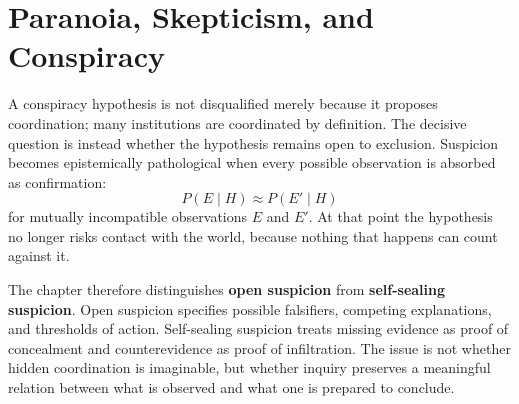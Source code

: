 
\chapter{Paranoia, Skepticism, and Conspiracy}
\label{ch:ch004}


A conspiracy hypothesis is not disqualified merely because it proposes coordination; many institutions are coordinated by definition. The decisive question is instead whether the hypothesis remains open to exclusion. Suspicion becomes epistemically pathological when every possible observation is absorbed as confirmation:
\[
P(E\mid H)\approx P(E'\mid H)
\]
for mutually incompatible observations \(E\) and \(E'\). At that point the hypothesis no longer risks contact with the world, because nothing that happens can count against it.

The chapter therefore distinguishes \textbf{open suspicion} from \textbf{self-sealing suspicion}. Open suspicion specifies possible falsifiers, competing explanations, and thresholds of action. Self-sealing suspicion treats missing evidence as proof of concealment and counterevidence as proof of infiltration. The issue is not whether hidden coordination is imaginable, but whether inquiry preserves a meaningful relation between what is observed and what one is prepared to conclude.
